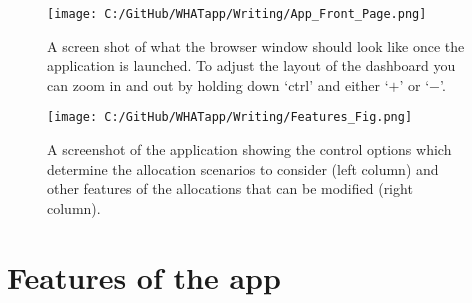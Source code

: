 \documentclass[11pt]{article}
\begin{document}
 \begin{figure} [h]
  \centering
\texttt{[image: C:/GitHub/WHATapp/Writing/App\_Front\_Page.png]}
  \caption {A screen shot of what the browser window should look like once the application is launched. To adjust the layout of the dashboard you can zoom in and out by holding down `ctrl' and either `$+$' or `$-$'.}
  \label{fig:frontpg}
\end{figure}


 \begin{figure} [h]
  \centering
\texttt{[image: C:/GitHub/WHATapp/Writing/Features\_Fig.png]}
  \caption {A screenshot of the application showing the control options which determine the allocation scenarios to consider (left column) and other features of the allocations that can be modified (right column).}
  \label{fig:featpg}
\end{figure}


\section{Features of the app}
\end{document}
